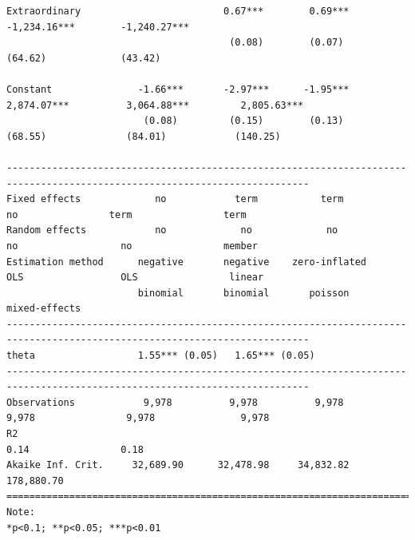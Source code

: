 \documentclass[letter,12pt]{article}
\begin{document}
\begin{table}
\begin{tiny}
\begin{verbatim}
Extraordinary                         0.67***        0.69***                              -1,234.16***        -1,240.27*** 
                                       (0.08)        (0.07)                                  (64.62)             (43.42)   
                                                                                                                           
Constant               -1.66***       -2.97***      -1.95***          2,874.07***          3,064.88***         2,805.63*** 
                        (0.08)         (0.15)        (0.13)             (68.55)              (84.01)            (140.25)   
                                                                                                                           
---------------------------------------------------------------------------------------------------------------------------
Fixed effects             no            term           term                no                term                term      
Random effects            no             no             no                 no                  no                member     
Estimation method      negative       negative    zero-inflated           OLS                 OLS                linear     
                       binomial       binomial       poisson                                                  mixed-effects 
---------------------------------------------------------------------------------------------------------------------------
theta                  1.55*** (0.05)   1.65*** (0.05)                                                                   
---------------------------------------------------------------------------------------------------------------------------
Observations            9,978          9,978          9,978              9,978                9,978               9,978    
R2                                                                        0.14                0.18                         
Akaike Inf. Crit.     32,689.90      32,478.98     34,832.82                                                   178,880.70  
===========================================================================================================================
Note:                                                                                                *p<0.1; **p<0.05; ***p<0.01
\end{verbatim}
  \end{tiny}
  \caption{Models of legislative debate (standard errors in parentheses)} 
  \label{T:regs} 
\end{table} 
\end{document}
